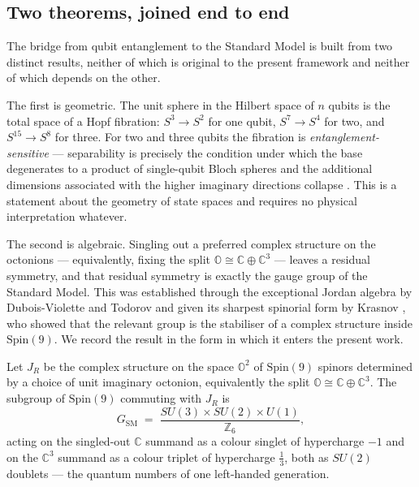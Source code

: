\subsection{Two theorems, joined end to end}

The bridge from qubit entanglement to the Standard Model is built from two distinct results, neither of which is original to the present framework and neither of which depends on the other.

The first is geometric. The unit sphere in the Hilbert space of $n$ qubits is the total space of a Hopf fibration: $S^3 \to S^2$ for one qubit, $S^7 \to S^4$ for two, and $S^{15} \to S^8$ for three. For two and three qubits the fibration is \emph{entanglement-sensitive} --- separability is precisely the condition under which the base degenerates to a product of single-qubit Bloch spheres and the additional dimensions associated with the higher imaginary directions collapse \autocite{mosseri2001hopf,bernevigchen2003geometry}. This is a statement about the geometry of state spaces and requires no physical interpretation whatever.

The second is algebraic. Singling out a preferred complex structure on the octonions --- equivalently, fixing the split $\mathbb{O} \cong \mathbb{C} \oplus \mathbb{C}^3$ --- leaves a residual symmetry, and that residual symmetry is exactly the gauge group of the Standard Model. This was established through the exceptional Jordan algebra by Dubois-Violette and Todorov \autocite{duboisviolette2016exceptional,duboisviolettetodorov2019exceptional,todorovduboisviolette2018deducing} and given its sharpest spinorial form by Krasnov \autocite{krasnov2021so9}, who showed that the relevant group is the stabiliser of a complex structure inside $\mathrm{Spin}(9)$. We record the result in the form in which it enters the present work.

\begin{proposition}\label{prop:gsm}
Let $J_R$ be the complex structure on the space $\mathbb{O}^2$ of $\mathrm{Spin}(9)$ spinors determined by a choice of unit imaginary octonion, equivalently the split $\mathbb{O} \cong \mathbb{C} \oplus \mathbb{C}^3$. The subgroup of $\mathrm{Spin}(9)$ commuting with $J_R$ is
\[
  G_{\mathrm{SM}} \;=\; \frac{SU(3) \times SU(2) \times U(1)}{\mathbb{Z}_6},
\]
acting on the singled-out $\mathbb{C}$ summand as a colour singlet of hypercharge $-1$ and on the $\mathbb{C}^3$ summand as a colour triplet of hypercharge $\tfrac{1}{3}$, both as $SU(2)$ doublets --- the quantum numbers of one left-handed generation.
\end{proposition}

